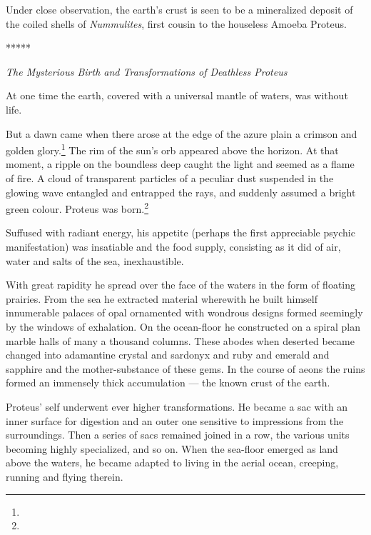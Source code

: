 \documentclass[a4paper, 12pt, oneside]{article}
\begin{document}
Under close observation, the earth's crust is seen to be a mineralized deposit of the coiled shells of \emph{Nummulites}, first cousin to the houseless Amoeba Proteus.

\centerline{*\hspace{15mm}*\hspace{15mm}*\hspace{15mm}*\hspace{15mm}*}
\bigskip

\centerline{\emph{The Mysterious Birth and Transformations of Deathless Proteus}}

At one time the earth, covered with a universal mantle of waters, was without life.

But a dawn came when there arose at the edge of the azure plain a crimson and golden glory.\footnote{} The rim of the sun's orb appeared above the horizon. At that moment, a ripple on the boundless deep caught the light and seemed as a flame of fire. A cloud of transparent particles of a peculiar dust suspended in the glowing wave entangled and entrapped the rays, and suddenly assumed a bright green colour. Proteus was born.\footnote{}

Suffused with radiant energy, his appetite (perhaps the first appreciable psychic manifestation) was insatiable and the food supply, consisting as it did of air, water and salts of the sea, inexhaustible.

With great rapidity he spread over the face of the waters in the form of floating prairies. From the sea he extracted material wherewith he built himself innumerable palaces of opal ornamented with wondrous designs formed seemingly by the windows of exhalation. On the ocean-floor he constructed on a spiral plan marble halls of many a thousand columns. These abodes when deserted became changed into adamantine crystal and sardonyx and ruby and emerald and sapphire and the mother-substance of these gems. In the course of aeons the ruins formed an immensely thick accumulation --- the known crust of the earth.

Proteus' self underwent ever higher transformations. He became a sac with an inner surface for digestion and an outer one sensitive to impressions from the surroundings. Then a series of sacs remained joined in a row, the various units becoming highly specialized, and so on. When the sea-floor emerged as land above the waters, he became adapted to living in the aerial ocean, creeping, running and flying therein.
\end{document}
